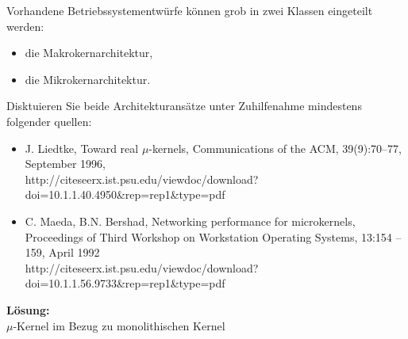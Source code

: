 

\begin{description}

Vorhandene Betriebssystementwürfe können grob in zwei Klassen eingeteilt werden:
\begin{itemize}
	\item die Makrokernarchitektur,
	\item die Mikrokernarchitektur.
\end{itemize}
Disktuieren Sie beide Architekturansätze unter Zuhilfenahme mindestens folgender quellen:
\footnotesize{\begin{itemize}
	\item J. Liedtke, Toward real $\mu$-kernels, Communications of the ACM, 39(9):70--77, September 1996, \\http://citeseerx.ist.psu.edu/viewdoc/download?doi=10.1.1.40.4950\&rep=rep1\&type=pdf
	\item C. Maeda, B.N. Bershad, Networking performance for microkernels, Proceedings of Third Workshop on Workstation Operating Systems, 13:154 – 159, April 1992 \\http://citeseerx.ist.psu.edu/viewdoc/download?doi=10.1.1.56.9733\&rep=rep1\&type=pdf 
\end{itemize}}

\textbf{Lösung:}\\
\(\mu\)-Kernel im Bezug zu monolithischen Kernel


\end{description}
